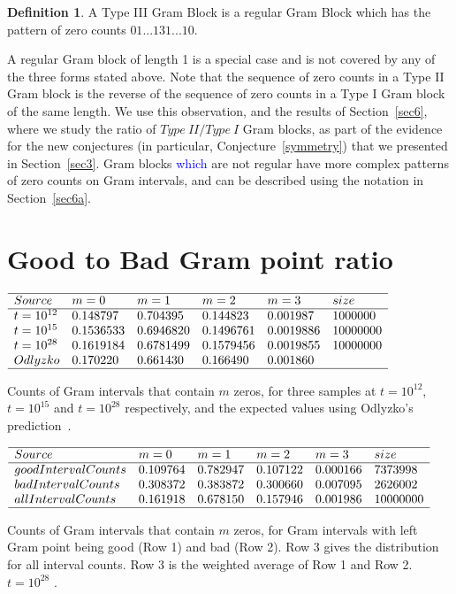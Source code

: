 \documentclass[twoside]{article}
\theoremstyle{definition}
\newtheorem{defn}{Definition}
\begin{document}
{
\begin{defn}\label{gramblockIII}
A Type III Gram Block is a regular Gram Block which has the pattern of zero counts $01 . . . 131 . . . 10$.
\end{defn}
}
A regular Gram block of length 1 is a special case and is not covered by any of the three forms stated above. Note that the sequence of zero counts in a Type II Gram block is the reverse of the sequence of zero counts in a Type I Gram block of the same length. We use this observation, and the results of Section~\ref{sec6}, where we study the ratio of $Type~II/Type~I$ Gram blocks, as part of the evidence for the new conjectures (in particular,  Conjecture~\ref{symmetry}) that we presented in Section~\ref{sec3}. Gram blocks \textcolor{blue}{which} are not regular have more complex patterns of zero counts on Gram intervals, and can be described using the notation in Section~\ref{sec6a}.

\section{\label{sec5}Good to Bad Gram point ratio}

\begin{table}
\centering \(\begin{array}{llllll}
\hline
Source &m = 0&m = 1&m = 2&m = 3&size\\
\hline
t = 10^{12}&0.148797&0.704395&0.144823&0.001987&1000000\\
t = 10^{15}&0.1536533&0.6946820&0.1496761&0.0019886&10000000\\
t = 10^{28}&0.1619184&0.6781499&0.1579456&0.0019855&10000000\\
Odlyzko&0.170220&0.661430&0.166490&0.001860&\\
\hline
\end{array}\)
\caption{Counts of Gram intervals that contain $m$ zeros, for three samples at $t=10^{12}$, $t=10^{15}$  and $t=10^{28}$ respectively, and the  expected values using Odlyzko's prediction~\cite{Odlyzko 1992}.} \label{tab:intervalzeros}
\end{table}

\begin{table}
\centering \(\begin{array}{llllll}
\hline
Source &m = 0&m = 1&m = 2&m = 3&size\\
\hline
goodIntervalCounts &0.109764 &0.782947 &0.107122 &0.000166 &7373998  \\
badIntervalCounts &0.308372 &0.383872 &0.300660 &0.007095 &2626002  \\
allIntervalCounts&0.161918&0.678150&0.157946&0.001986&10000000\\
\hline
\end{array}\)
\caption{Counts of Gram intervals that contain $m$ zeros, for Gram intervals with left Gram point being good (Row 1) and bad (Row 2). Row 3 gives
the distribution for all interval counts. Row 3 is the weighted average of Row 1 and Row 2.  $t=10^{28}$ .} 
\label{tab:conditionalintervalcounts}
\end{table}
\end{document}
